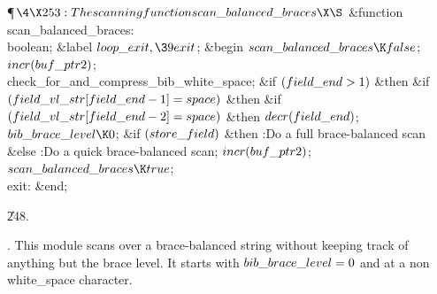 \Y\P$\4\X253:The scanning function \\{scan\_balanced\_braces}\X\S$\6
\4\&{function}\1\  \\{scan\_balanced\_braces}: \\{boolean};\6
\4\&{label} $\\{loop\_exit},\39\\{exit}$;\2\6
\&{begin} $\\{scan\_balanced\_braces}\K\\{false}$;\6
$\\{incr}(\\{buf\_ptr2})$;\6
\\{check\_for\_and\_compress\_bib\_white\_space};\6
\&{if} $(\\{field\_end}>1)$ \1\&{then}\6
\&{if} $(\\{field\_vl\_str}[\\{field\_end}-1]=\\{space})$ \1\&{then}\6
\&{if} $(\\{field\_vl\_str}[\\{field\_end}-2]=\\{space})$ \1\&{then}\6
$\\{decr}(\\{field\_end})$;\2\2\2\6
$\\{bib\_brace\_level}\K0$;\6
\&{if} $(\\{store\_field})$ \1\&{then}\5
:Do a full brace-balanced scan\X\6
\4\&{else} :Do a quick brace-balanced scan\X;\2\6
$\\{incr}(\\{buf\_ptr2})$;\6
$\\{scan\_balanced\_braces}\K\\{true}$;\6
\4\\{exit}: \&{end};\par
\U248.\fi

.
This module scans over a brace-balanced string without keeping track
of anything but the brace level.  It starts with $\\{bib\_brace\_level}=0$
and at a non\\{white\_space} character.

